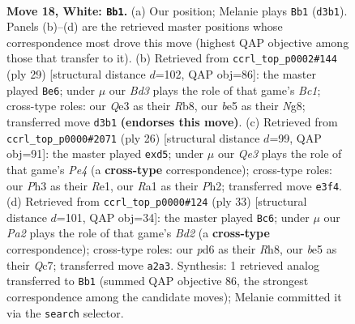 \documentclass[11pt]{article}
\begin{document}
\clearpage

\begin{figure}[p]\centering
\begin{subfigure}{0.46\textwidth}\centering
\resizebox{\linewidth}{!}{%
\newchessgame
\chessboard[
  setfen={r1br4/ppp2pkp/3p4/4b1p1/N1P1Pn1q/3BQ2P/PP3PP1/R1B2R1K w - - 2 18},
  showmover=false,
  pgfstyle=straightmove, color=movearrow, markmove={d3-b1}
]}
\caption{}
\end{subfigure}\hfill
\begin{subfigure}{0.46\textwidth}\centering
\resizebox{\linewidth}{!}{%
\newchessgame
\chessboard[
  setfen={1rb1k1nr/2q2pbp/pNp3p1/2Ppp3/1P6/P7/1BP1QPPP/R3KB1R b KQk - 5 15},
  showmover=false,
  pgfstyle=straightmove, color=movearrow, markmove={c8-e6}
]}
\caption{}
\end{subfigure}
\\[4pt]
\begin{subfigure}{0.46\textwidth}\centering
\resizebox{\linewidth}{!}{%
\newchessgame
\chessboard[
  setfen={2r1kb1r/1b1p1ppp/p3p3/qp1n4/3QPP2/3BB3/PPP3PP/1K1RR3 w k - 0 14},
  showmover=false,
  pgfstyle=straightmove, color=movearrow, markmove={e4-d5}
]}
\caption{}
\end{subfigure}\hfill
\begin{subfigure}{0.46\textwidth}\centering
\resizebox{\linewidth}{!}{%
\newchessgame
\chessboard[
  setfen={1r2k2r/2qbbpp1/3ppn2/pp4Bp/4PN1P/5P2/PPPQ2P1/1K1R1B1R b k - 1 17},
  showmover=false,
  pgfstyle=straightmove, color=movearrow, markmove={d7-c6}
]}
\caption{}
\end{subfigure}
\caption{\textbf{Move 18, White: \texttt{Bb1}.} (a) Our position; Melanie plays \texttt{Bb1} (\texttt{d3b1}). Panels (b)--(d) are the retrieved master positions whose correspondence most drove this move (highest QAP objective among those that transfer to it). (b) Retrieved from \texttt{ccrl\_top\_p0002\#144} (ply 29) [structural distance $d$=102, QAP obj=86]: the master played \texttt{Be6}; under $\mu$ our \emph{Bd3} plays the role of that game's \emph{Bc1}; cross-type roles: our \emph{Q}e3 as their \emph{R}b8, our \emph{b}e5 as their \emph{N}g8; transferred move \texttt{d3b1} \textbf{(endorses this move)}. (c) Retrieved from \texttt{ccrl\_top\_p0000\#2071} (ply 26) [structural distance $d$=99, QAP obj=91]: the master played \texttt{exd5}; under $\mu$ our \emph{Qe3} plays the role of that game's \emph{Pe4} (a \textbf{cross-type} correspondence); cross-type roles: our \emph{P}h3 as their \emph{R}e1, our \emph{R}a1 as their \emph{P}h2; transferred move \texttt{e3f4}. (d) Retrieved from \texttt{ccrl\_top\_p0000\#124} (ply 33) [structural distance $d$=101, QAP obj=34]: the master played \texttt{Bc6}; under $\mu$ our \emph{Pa2} plays the role of that game's \emph{Bd2} (a \textbf{cross-type} correspondence); cross-type roles: our \emph{p}d6 as their \emph{R}h8, our \emph{b}e5 as their \emph{Q}c7; transferred move \texttt{a2a3}. Synthesis: 1 retrieved analog transferred to \texttt{Bb1} (summed QAP objective 86, the strongest correspondence among the candidate moves); Melanie committed it via the \texttt{search} selector.}
\label{fig:thought-m34}
\end{figure}
\end{document}
